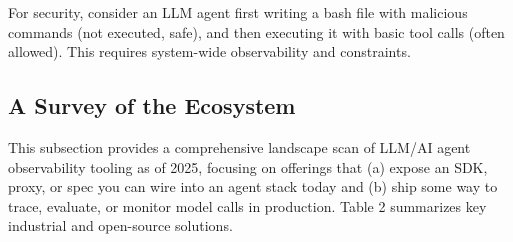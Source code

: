 \documentclass[sigplan,screen,review,9pt]{acmart}
\begin{document}
For security, consider an LLM agent first writing a bash file with malicious commands (not executed, safe), and then executing it with basic tool calls (often allowed). This requires system-wide observability and constraints.

\subsection{A Survey of the Ecosystem}

This subsection provides a comprehensive landscape scan of LLM/AI agent observability tooling as of 2025, focusing on offerings that (a) expose an SDK, proxy, or spec you can wire into an agent stack today and (b) ship some way to trace, evaluate, or monitor model calls in production. Table 2 summarizes key industrial and open-source solutions.
\end{document}
